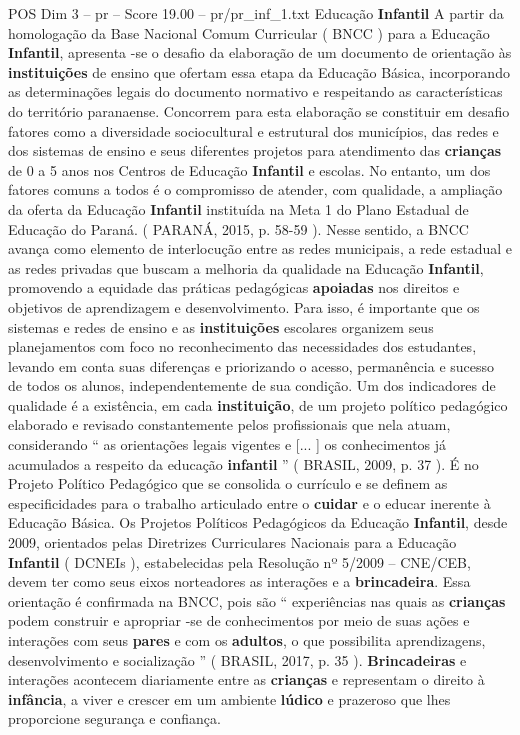 \begin{textsample}{POS Dim 3 – pr – Score 19.00 – pr/pr\_inf\_1.txt}  \label{ex:f3_pos_158}
Educação \textbf{Infantil} A partir da homologação da Base Nacional Comum Curricular ( BNCC ) para a Educação \textbf{Infantil}, apresenta -se o desafio da elaboração de um documento de orientação às \textbf{instituições} de ensino que ofertam essa etapa da Educação Básica, incorporando as determinações legais do documento normativo e respeitando as características do território paranaense.
Concorrem para esta elaboração se constituir em desafio fatores como a diversidade sociocultural e estrutural dos municípios, das redes e dos sistemas de ensino e seus diferentes projetos para atendimento das \textbf{crianças} de 0 a 5 anos nos Centros de Educação \textbf{Infantil} e escolas.
No entanto, um dos fatores comuns a todos é o compromisso de atender, com qualidade, a ampliação da oferta da Educação \textbf{Infantil} instituída na Meta 1 do Plano Estadual de Educação do Paraná. ( PARANÁ, 2015, p. 58-59 ).
Nesse sentido, a BNCC avança como elemento de interlocução entre as redes municipais, a rede estadual e as redes privadas que buscam a melhoria da qualidade na Educação \textbf{Infantil}, promovendo a equidade das práticas pedagógicas \textbf{apoiadas} nos direitos e objetivos de aprendizagem e desenvolvimento.
Para isso, é importante que os sistemas e redes de ensino e as \textbf{instituições} escolares organizem seus planejamentos com foco no reconhecimento das necessidades dos estudantes, levando em conta suas diferenças e priorizando o acesso, permanência e sucesso de todos os alunos, independentemente de sua condição.
Um dos indicadores de qualidade é a existência, em cada \textbf{instituição}, de um projeto político pedagógico elaborado e revisado constantemente pelos profissionais que nela atuam, considerando “ as orientações legais vigentes e [... ] os conhecimentos já acumulados a respeito da educação \textbf{infantil} ” ( BRASIL, 2009, p. 37 ).
É no Projeto Político Pedagógico que se consolida o currículo e se definem as especificidades para o trabalho articulado entre o \textbf{cuidar} e o educar inerente à Educação Básica.
Os Projetos Políticos Pedagógicos da Educação \textbf{Infantil}, desde 2009, orientados pelas Diretrizes Curriculares Nacionais para a Educação \textbf{Infantil} ( DCNEIs ), estabelecidas pela Resolução nº 5/2009 – CNE/CEB, devem ter como seus eixos norteadores as interações e a \textbf{brincadeira}.
Essa orientação é confirmada na BNCC, pois são “ experiências nas quais as \textbf{crianças} podem construir e apropriar -se de conhecimentos por meio de suas ações e interações com seus \textbf{pares} e com os \textbf{adultos}, o que possibilita aprendizagens, desenvolvimento e socialização ” ( BRASIL, 2017, p. 35 ). \textbf{Brincadeiras} e interações acontecem diariamente entre as \textbf{crianças} e representam o direito à \textbf{infância}, a viver e crescer em um ambiente \textbf{lúdico} e prazeroso que lhes proporcione segurança e confiança.

\end{textsample}
